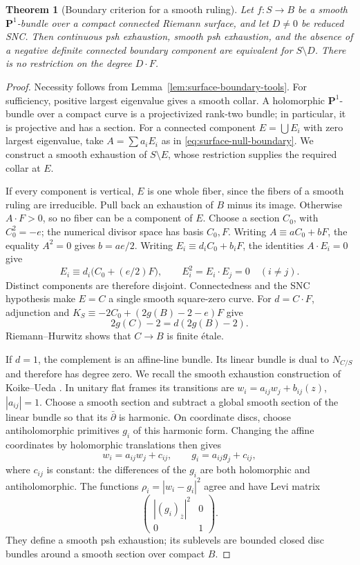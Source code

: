 \documentclass[11pt]{amsart}
\newtheorem{theorem}{Theorem}[section]
\theoremstyle{definition}
\theoremstyle{remark}
\numberwithin{equation}{section}
\newcommand{\PP}{\mathbf P}
\begin{document}
\begin{theorem}[Boundary criterion for a smooth ruling]
\label{cor:ruled-all-degrees}
Let $f:S\to B$ be a smooth $\PP^1$-bundle over a compact connected
Riemann surface, and let $D\ne0$ be reduced SNC. Then continuous psh
exhaustion, smooth psh exhaustion, and the absence of a negative
definite connected boundary component are equivalent for $S\setminus D$.
There is no restriction on the degree $D\cdot F$.
\end{theorem}
\begin{proof}
Necessity follows from Lemma~\ref{lem:surface-boundary-tools}. For
sufficiency, positive largest eigenvalue gives a smooth collar. A
holomorphic $\PP^1$-bundle over a compact curve is a projectivized
rank-two bundle; in particular, it is projective and has a section.
For a
connected component $E=\bigcup E_i$ with zero largest eigenvalue, take
$A=\sum a_iE_i$ as in \eqref{eq:surface-null-boundary}. We construct a
smooth exhaustion of $S\setminus E$, whose restriction supplies the
required collar at $E$.

If every component is vertical, $E$ is one whole fiber, since the
fibers of a smooth ruling are irreducible. Pull back an exhaustion
of $B$ minus its image. Otherwise $A\cdot F>0$, so no fiber can be a
component of $E$. Choose a section $C_0$, with $C_0^2=-e$; the
numerical divisor space has basis $C_0,F$. Writing
$A\equiv aC_0+bF$, the equality $A^2=0$ gives $b=ae/2$.
Writing $E_i\equiv d_iC_0+b_iF$, the identities $A\cdot E_i=0$ give
\[
 E_i\equiv d_i\bigl(C_0+(e/2)F\bigr),\qquad
 E_i^2=E_i\cdot E_j=0\quad(i\ne j).
\]
Distinct components are therefore disjoint. Connectedness and the
SNC hypothesis make $E=C$ a single smooth square-zero curve. For
$d=C\cdot F$, adjunction and
$K_S\equiv-2C_0+(2g(B)-2-e)F$ give
\[
 2g(C)-2=d(2g(B)-2).
\]
Riemann--Hurwitz shows that $C\to B$ is finite \'etale.

If $d=1$, the complement is an affine-line bundle. Its linear bundle
is dual to $N_{C/S}$ and therefore has degree zero. We recall the smooth exhaustion construction of
Koike--Ueda \cite[Proposition~2.1]{KoikeUeda2025}. In unitary flat
frames its transitions are $w_i=a_{ij}w_j+b_{ij}(z)$, $|a_{ij}|=1$.
Choose a smooth section and subtract a global smooth section of the linear
bundle so that its $\bar\partial$ is harmonic. On coordinate discs,
choose antiholomorphic primitives $g_i$ of this harmonic form.
Changing the affine coordinates by holomorphic translations then gives
\[
 w_i=a_{ij}w_j+c_{ij},\qquad
 g_i=a_{ij}g_j+c_{ij},
\]
where $c_{ij}$ is constant: the differences of the $g_i$ are both
holomorphic and antiholomorphic. The functions
$\rho_i=|w_i-g_i|^2$ agree and have Levi matrix
\[
 \begin{pmatrix}|(g_i)_{\bar z}|^2&0\\0&1\end{pmatrix}.
\]
They define a smooth psh exhaustion; its sublevels are bounded closed
disc bundles around a smooth section over compact $B$.


\end{proof}
\end{document}
